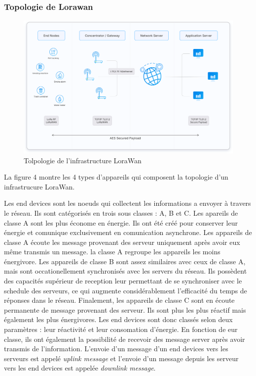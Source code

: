 \subsubsection{Topologie de Lorawan}

\begin{figure}[h]
\centering

\includegraphics[scale=0.1]{images/architecture.png}
\caption{Tolpologie de l'infrastructure LoraWan}\label{term4}
\end{figure}

La figure 4 montre les 4 types d'appareils qui composent la topologie d'un infrastrucure LoraWan. 

Les end devices sont les noeuds qui collectent les informations a envoyer à travers le réseau. Ils sont catégorisés en trois sous classes : A, B et C. Les apareils de classe A sont les plus économe en énergie. Ils ont été créé pour conserver leur énergie et comunique exclusivement en comunication asynchrone. Les appareils de classe A écoute les message provenant des serveur uniquement après avoir eux même transmis un message. la classe A regroupe les appareils les moins énergivore. Les appareils de classe B sont assez similaires avec ceux de classe A, mais sont occationellement synchronisés avec les servers du réseau. Ils possèdent des capacités supérieur de reception leur permettant de se synchroniser avec le schedule des serveurs, ce qui augmente considérablement l'efficacité du temps de réponses dans le réseau. Finalement, les appareils de classe C sont en écoute permanente de message provenant des serveur. Ils sont plus les plus réactif mais également les plus énergivores. Les end devices sont donc classés selon deux paramètres : leur réactivité et leur consomation d'énergie. En fonction de eur classe, ils ont également la possibilité de recevoir des message server après avoir transmis de l'information. L'envoie d'un message d'un end devices vers les serveurs est appelé \textit{uplink message} et l'envoie d'un message depuis les serveur vers les end devices est appelée \textit{downlink message}.


